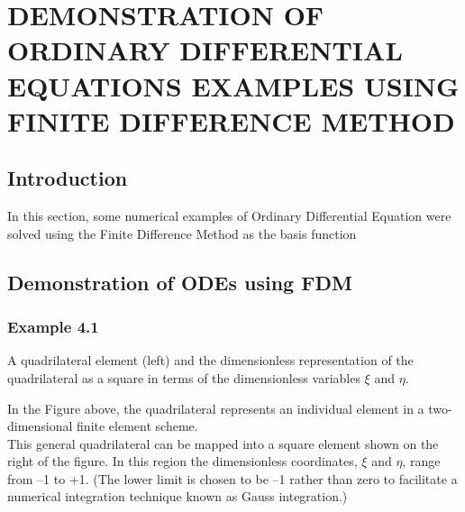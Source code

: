 \documentclass[12pt]{report}
\newcommand{\NI}{\noindent}
\begin{document}
	\chapter{DEMONSTRATION OF ORDINARY DIFFERENTIAL EQUATIONS EXAMPLES USING FINITE DIFFERENCE METHOD}
	
	\section{Introduction}
	In this section, some numerical examples of Ordinary Differential Equation were solved using the Finite Difference Method as the basis function
	
	
	\section{Demonstration of ODEs using FDM}
	\subsection*{Example 4.1}
	A quadrilateral element (left) and the dimensionless representation of the quadrilateral as a square in terms of the dimensionless variables $\xi$ and $\eta$.
	\begin{center}
	\end{center}
	In the Figure above, the quadrilateral represents an individual element in a two-dimensional finite element scheme.\\
	
	\NI This general quadrilateral can be mapped into a square element shown on the right of the figure. In this region the dimensionless coordinates, $\xi$ and $\eta$, range from –1 to +1. (The lower limit is chosen to be –1 rather than zero to facilitate a numerical integration technique known
	as Gauss integration.)\\
	
\end{document}
